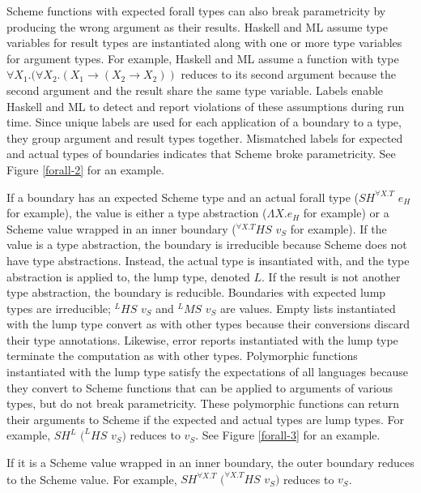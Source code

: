 Scheme functions with expected forall types can also break parametricity by producing the wrong argument as their results.  Haskell and ML assume type variables for result types are instantiated along with one or more type variables for argument types.  For example, Haskell and ML assume a function with type $\forall X_{1}.(\forall X_{2}.(X_{1}\rightarrow(X_{2}\rightarrow X_{2}))$ reduces to its second argument because the second argument and the result share the same type variable.  Labels enable Haskell and ML to detect and report violations of these assumptions during run time.  Since unique labels are used for each application of a boundary to a type, they group argument and result types together.  Mismatched labels for expected and actual types of boundaries indicates that Scheme broke parametricity.  See Figure \ref{forall-2} for an example.



If a boundary has an expected Scheme type and an actual forall type ($SH^{\forall X.T}$ $e_{H}$ for example), the value is either a type abstraction ($\Lambda X.e_{H}$ for example) or a Scheme value wrapped in an inner boundary ($^{\forall X.T}HS$ $v_{S}$ for example).  If the value is a type abstraction, the boundary is irreducible because Scheme does not have type abstractions.  Instead, the actual type is insantiated with, and the type abstraction is applied to, the lump type, denoted $L$.  If the result is not another type abstraction, the boundary is reducible.  Boundaries with expected lump types are irreducible; $^{L}HS$ $v_{S}$ and $^{L}MS$ $v_{S}$ are values.  Empty lists instantiated with the lump type convert as with other types because their conversions discard their type annotations.  Likewise, error reports instantiated with the lump type terminate the computation as with other types.  Polymorphic functions instantiated with the lump type satisfy the expectations of all languages because they convert to Scheme functions that can be applied to arguments of various types, but do not break parametricity.  These polymorphic functions can return their arguments to Scheme if the expected and actual types are lump types.  For example, $SH^{L}$ $(^{L}HS$ $v_{S})$ reduces to $v_{S}$.  See Figure \ref{forall-3} for an example.



If it is a Scheme value wrapped in an inner boundary, the outer boundary reduces to the Scheme value.  For example, $SH^{\forall X.T}$ $(^{\forall X.T}HS$ $v_{S})$ reduces to $v_{S}$.










